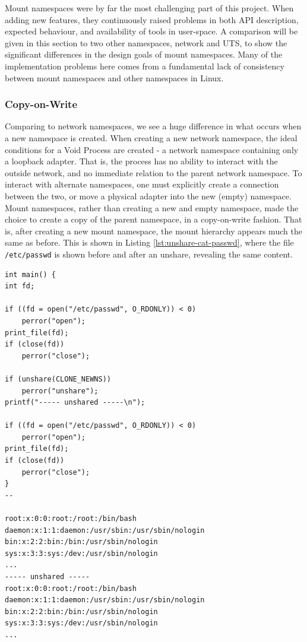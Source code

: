 \documentclass[sigplan]{acmart}
\begin{document}
Mount namespaces were by far the most challenging part of this project. When adding new features, they continuously raised problems in both API description, expected behaviour, and availability of tools in user-space. A comparison will be given in this section to two other namespaces, network and UTS, to show the significant differences in the design goals of mount namespaces. Many of the implementation problems here comes from a fundamental lack of consistency between mount namespaces and other namespaces in Linux.

\subsubsection{Copy-on-Write}

Comparing to network namespaces, we see a huge difference in what occurs when a new namespace is created. When creating a new network namespace, the ideal conditions for a Void Process are created - a network namespace containing only a loopback adapter. That is, the process has no ability to interact with the outside network, and no immediate relation to the parent network namespace. To interact with alternate namespaces, one must explicitly create a connection between the two, or move a physical adapter into the new (empty) namespace. Mount namespaces, rather than creating a new and empty namespace, made the choice to create a copy of the parent namespace, in a copy-on-write fashion. That is, after creating a new mount namespace, the mount hierarchy appears much the same as before. This is shown in Listing \ref{lst:unshare-cat-passwd}, where the file \texttt{/etc/passwd} is shown before and after an unshare, revealing the same content.

\begin{lstlisting}[float,label={lst:unshare-cat-passwd}]
int main() {
int fd;

if ((fd = open("/etc/passwd", O_RDONLY)) < 0)
    perror("open");
print_file(fd);
if (close(fd))
    perror("close");

if (unshare(CLONE_NEWNS))
    perror("unshare");
printf("----- unshared -----\n");

if ((fd = open("/etc/passwd", O_RDONLY)) < 0)
    perror("open");
print_file(fd);
if (close(fd))
    perror("close");
}
--

root:x:0:0:root:/root:/bin/bash
daemon:x:1:1:daemon:/usr/sbin:/usr/sbin/nologin
bin:x:2:2:bin:/bin:/usr/sbin/nologin
sys:x:3:3:sys:/dev:/usr/sbin/nologin
...
----- unshared -----
root:x:0:0:root:/root:/bin/bash
daemon:x:1:1:daemon:/usr/sbin:/usr/sbin/nologin
bin:x:2:2:bin:/bin:/usr/sbin/nologin
sys:x:3:3:sys:/dev:/usr/sbin/nologin
...
\end{lstlisting}
\end{document}
